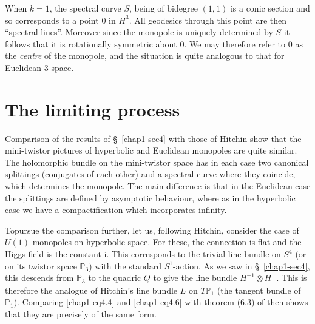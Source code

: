 When $k=1$, the spectral curve $S$, being of bidegree $(1,1)$ is a
conic section and so corresponds to a point $0$ in $H^{3}$. All
geodesics through this point are then ``spectral lines''. Moreover
since the monopole is uniquely determined by $S$ it follows that it is
rotationally symmetric about $0$. We may therefore refer to $0$ as the
{\em centre} of the monopole, and the situation is quite analogous to
that for Euclidean 3-space.

\section{The limiting process}\label{chap1-sec5}

Comparison of the results of \S\ \ref{chap1-sec4} with those of
Hitchin \cite{chap1-key7} show that the mini-twistor pictures of
hyperbolic and Euclidean monopoles are quite similar. The holomorphic
bundle on the mini-twistor space has in each case two canonical
splittings (conjugates of each other) and a spectral curve where they
coincide, which determines the monopole. The main difference is that
in the Euclidean case the splittings are defined by asymptotic
behaviour, where as in the hyperbolic case we have a compactification
which incorporates infinity. 

To\pageoriginale pursue the comparison further, let us, following
Hitchin, consider the case of $U(1)$-monopoles on hyperbolic
space. For these, the connection is flat and the Higgs field is the
constant i. This corresponds to the trivial line bundle on $S^{4}$ (or
on its twistor space $\mathbb{P}_{3}$) with the standard
$S^{1}$-action. As we saw in \S\ \ref{chap1-sec4}, this descends from
$\mathbb{P}_{3}$ to the quadric $Q$ to give the line bundle
$H^{-1}_{+}\otimes H_{-}$. This is therefore the analogue of Hitchin's
line bundle $L$ on $T\mathbb{P}_{1}$ (the tangent bundle of
$\mathbb{P}_{1}$). Comparing \eqref{chap1-eq4.4} and
\eqref{chap1-eq4.6} with theorem (6.3) of \cite{chap1-key7} then shows
that they are precisely of the same form.

